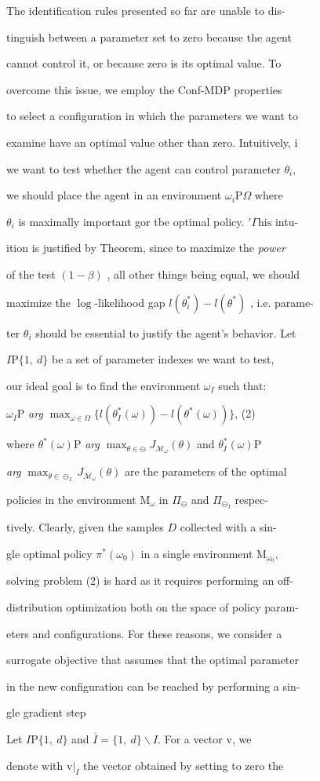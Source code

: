 \documentclass[a4paper,12pt]{article}
\begin{document}
The identification rules presented so far are unable to dis-

tinguish between a parameter set to zero because the agent

cannot control it, or because zero is its optimal value. To

overcome this issue, we employ the Conf-MDP properties

to select a configuration in which the parameters we want to

examine have an optimal value other than zero. Intuitively, $\mathrm{i}$

we want to test whether the agent can control parameter $\theta_{i},$

we should place the agent in an environment $\omega_{i} \mathrm{P} \Omega$ where

$\theta_{i}$ is maximally important gor tbe optimal policy. $\prime\Gamma \mathrm{h}\mathrm{i}\mathrm{s}$ intu-

ition is justified by Theorem, since to maximize the {\it power}

of the test $(1-\beta)$ , all other things being equal, we should

maximize the $\log$-likelihood gap $l(\theta_{i}^{*})-l(\theta^{*})$ , i.e. parame-

ter $\theta_{i}$ should be essential to justify the agent's behavior. Let

$I \mathrm{P} \{1,\ d\}$ be a set of parameter indexes we want to test,

our ideal goal is to find the environment $\omega_{I}$ such that:

$\omega_{I}\mathrm{P}$ {\it arg} $\displaystyle \max_{\omega\in\Omega}\{l(\theta_{I}^{*}(\omega))-l(\theta^{*}(\omega))\}$, (2)

where $\theta^{*}(\omega) \mathrm{P}$ {\it arg} $\displaystyle \max_{\theta\in\ominus}J_{\mathcal{M}_{\omega}}(\theta)$ and $\theta_{I}^{*}(\omega) \mathrm{P}$

{\it arg} $\displaystyle \max_{\theta\in\ominus_{I}}J_{\mathcal{M}_{\omega}}(\theta)$ are the parameters of the optimal

policies in the environment $\mathrm{M}_{\omega}$ in $\Pi_{\ominus}$ and $\Pi_{\ominus_{I}}$ respec-

tively. Clearly, given the samples $D$ collected with a sin-

gle optimal policy $\pi^{*}(\omega_{0})$ in a single environment $\mathrm{M}_{\omega_{0}},$

solving problem (2) is hard as it requires performing an off-

distribution optimization both on the space of policy param-

eters and configurations. For these reasons, we consider a

surrogate objective that assumes that the optimal parameter

in the new configuration can be reached by performing a sin-

gle gradient step

Let $I \mathrm{P}\{1,\ d\}$ and $\overline{I}=\{1,\ d\}\backslash I$. For a vector $\mathrm{v}$, we

denote with $\mathrm{v}|_{I}$ the vector obtained by setting to zero the
\end{document}
